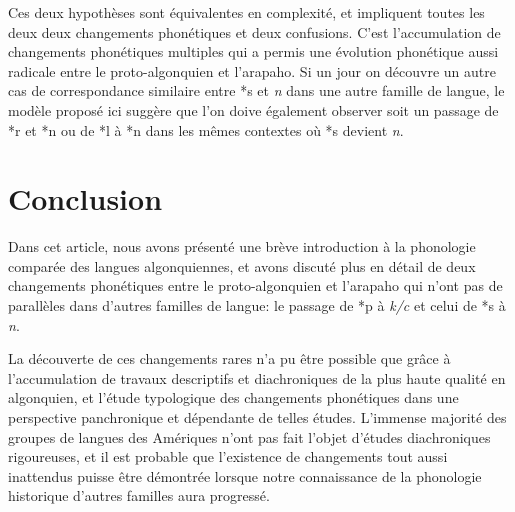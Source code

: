 \documentclass[twoside,a4paper,11pt]{article}
\newcommand{\ipa}[1]{{\phon\textit{#1}}}
\newcommand{\Σ}{\greek{Σ}}
\begin{document}
Ces deux hypothèses sont équivalentes en complexité, et impliquent toutes les deux deux changements phonétiques et deux confusions. C'est l'accumulation de changements phonétiques multiples qui a permis une évolution phonétique aussi radicale entre le proto-algonquien et l'arapaho. Si un jour on découvre un autre cas de correspondance similaire entre *s et \ipa{n} dans une autre famille de langue, le modèle proposé ici suggère que l'on doive également observer soit un passage de *r et *n ou de *l à *n dans les mêmes contextes où *s devient \ipa{n}.

\section{Conclusion}	
Dans cet article, nous avons présenté une brève introduction à la phonologie comparée des langues algonquiennes, et avons discuté plus en détail de deux changements phonétiques entre le proto-algonquien et l'arapaho qui n'ont pas de parallèles dans d'autres familles de langue: le passage de *p à \ipa{k/c} et celui de *s à \ipa{n}. 

La découverte de ces changements rares n'a pu être possible que grâce à l'accumulation de travaux descriptifs et diachroniques de la plus haute qualité en algonquien, et l'étude typologique des changements phonétiques dans une perspective panchronique et dépendante de telles études. L'immense majorité des groupes de langues des Amériques n'ont pas fait l'objet d'études diachroniques rigoureuses, et il est probable que l'existence de changements tout aussi inattendus puisse être démontrée lorsque notre connaissance de la phonologie historique d'autres familles aura progressé.

 
 
 
\end{document}
